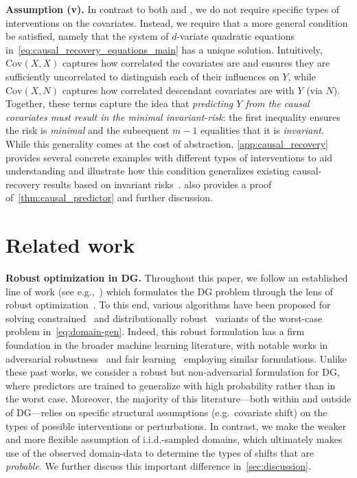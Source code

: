 \documentclass{article}
\begin{document}
\textbf{Assumption (v).} In contrast to both \citeauthor{peters2016causal} and \citeauthor{krueger21rex}, we do not require specific types of interventions on the covariates. Instead, we require that a more general condition be satisfied, namely that the system of $d$-variate quadratic equations in~\eqref{eq:causal_recovery_equations_main} has a unique solution. Intuitively, $\text{Cov}(X, X)$ captures how correlated the covariates are and ensures they are sufficiently uncorrelated to distinguish each of their influences on $Y$, while $\text{Cov}(X, N)$ captures how correlated descendant covariates are with $Y$ (via $N$). Together, these terms capture the idea that \emph{predicting $Y$ from the causal covariates must result in the minimal invariant-risk}:
the first inequality ensures the risk is \emph{minimal} and the subsequent $m - 1$ equalities that it is \emph{invariant}. While this generality comes at the cost of abstraction, \cref{app:causal_recovery} provides several concrete examples with different types of interventions to aid understanding and illustrate how this condition generalizes existing causal-recovery results based on invariant risks~\citep{peters2016causal, krueger21rex}.   also provides a proof of~\cref{thm:causal_predictor} and further discussion.


\section{Related work}\label{sec:related}
\textbf{Robust optimization in DG.}  Throughout this paper, we follow an established line of work (see e.g.,~\cite{arjovsky2020invariant,krueger21rex,ahuja2021invariance}) which formulates the DG problem through the lens of robust optimization~\cite{ben2009robust}.  To this end, various algorithms have been proposed for solving constrained~\cite{robey2021modelbased} and distributionally robust~\cite{sagawa2019distributionally} variants of the worst-case problem in~\eqref{eq:domain-gen}.  
%
Indeed, this robust formulation has a firm foundation in the broader machine learning literature, with notable works in adversarial robustness~\cite{goodfellow2014explaining,madry2017towards,zhang2019theoretically,robey2021adversarial,zhu2021adversarially} and fair learning~\cite{martinez2021blind,diana2021minimax} employing similar formulations. Unlike these past works, we consider a robust but non-adversarial formulation for DG, where predictors are trained to generalize with high probability rather than in the worst case. Moreover, the majority of this literature---both within and outside of DG---relies on specific structural assumptions (e.g.\ covariate shift) on the types of possible interventions or perturbations.
%
In contrast, we make the weaker and more flexible assumption of i.i.d.-sampled domains, which ultimately makes use of the observed domain-data to determine the types of shifts that are \emph{probable}. We further discuss this important difference in~\cref{sec:discussion}. 
%
\end{document}
